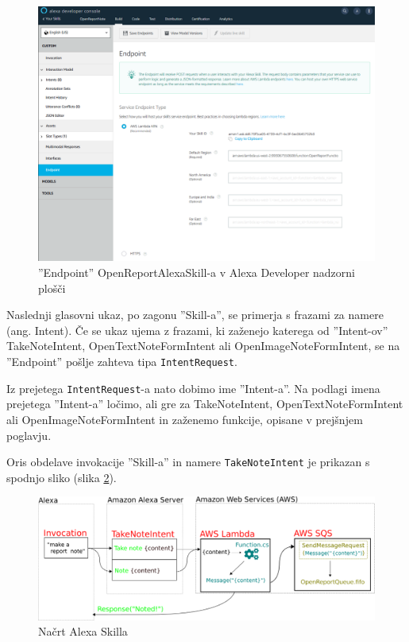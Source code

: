 \documentclass[a4paper, 12pt]{book}
\begin{document}
\begin{figure}[H]
\begin{center}
\includegraphics[width=13cm]{skill_endpoint}
\end{center}
\caption{''Endpoint'' OpenReportAlexaSkill-a v Alexa Developer nadzorni plošči}
\label{skill_endpoint}
\end{figure}

Naslednji glasovni ukaz, po zagonu ''Skill-a'', se primerja s frazami za namere (ang. Intent).
Če se ukaz ujema z frazami, ki zaženejo katerega od ''Intent-ov'' TakeNoteIntent, OpenTextNoteFormIntent ali OpenImageNoteFormIntent, se na ''Endpoint'' pošlje zahteva tipa \texttt{IntentRequest}.

Iz prejetega \texttt{IntentRequest}-a nato dobimo ime ''Intent-a''.
Na podlagi imena prejetega ''Intent-a'' ločimo, ali gre za TakeNoteIntent, OpenTextNoteFormIntent ali OpenImageNoteFormIntent in zaženemo funkcije, opisane v prejšnjem poglavju.

Oris obdelave invokacije ''Skill-a'' in namere \texttt{TakeNoteIntent} je prikazan s spodnjo sliko (slika \ref{skill}).

\begin{figure}[H]
\begin{center}
\includegraphics[width=13.5cm]{skill_2}
\end{center}
\caption{Načrt Alexa Skilla}
\label{skill}
\end{figure}
\end{document}
